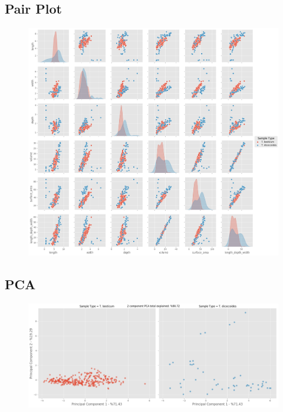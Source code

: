 \documentclass[11pt]{report}
\begin{document}
\subsection{Pair Plot}
\label{sec:orga5a44bc}

\begin{figure}[htbp]
\centering
\includegraphics[width=18cm]{./images/results/group4/pairplot.png}
\label{fig:orgec5099b}
\end{figure}

\clearpage
\subsection{PCA}
\label{sec:org2519b60}
\begin{figure}[htbp]
\centering
\includegraphics[width=18cm]{./images/results/group4/pca.png}
\label{fig:org85228c6}
\end{figure}
\end{document}
